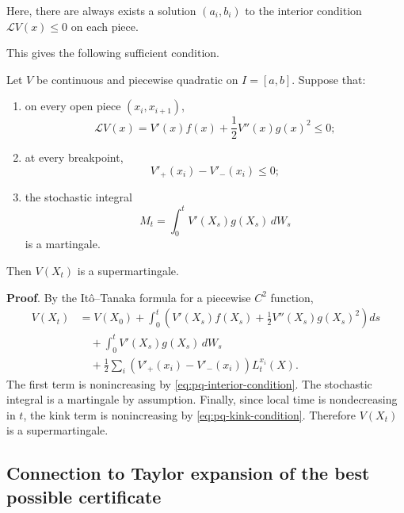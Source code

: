 Here, there are always exists a solution $(a_i,b_i)$ to the interior condition $\mathcal L V(x)\leq 0$ on each piece.

This gives the following sufficient condition.

\begin{fact}
Let $V$ be continuous and piecewise quadratic on $I=[a,b]$. Suppose that:
\begin{enumerate}
    \item on every open piece $(x_i,x_{i+1})$,
    \begin{equation}
        \mathcal L V(x)
        =
        V'(x)f(x)+\frac12 V''(x)g(x)^2
        \leq 0;
        \label{eq:pq-interior-condition}
    \end{equation}
    \item at every breakpoint,
    \begin{equation}
        V'_+(x_i)-V'_-(x_i)\leq 0;
        \label{eq:pq-kink-condition}
    \end{equation}
    \item the stochastic integral
    \begin{equation}
        M_t=\int_0^t V'(X_s)g(X_s)\,dW_s
    \end{equation}
    is a martingale.
\end{enumerate}
Then $V(X_t)$ is a supermartingale.

\textbf{Proof}. By the Itô--Tanaka formula for a piecewise $C^2$ function,
\begin{align}
    V(X_t)
    &=
    V(X_0)
    +
    \int_0^t
    \left(
        V'(X_s)f(X_s)+\frac12 V''(X_s)g(X_s)^2
    \right)ds                                                   \\
    &\quad+
    \int_0^t V'(X_s)g(X_s)\,dW_s                                \\
    &\quad+
    \frac12\sum_i
    \left(V'_+(x_i)-V'_-(x_i)\right)L_t^{x_i}(X).
\end{align}
The first term is nonincreasing by
\eqref{eq:pq-interior-condition}. The stochastic integral is a martingale by
assumption. Finally, since local time is nondecreasing in $t$, the kink term is
nonincreasing by \eqref{eq:pq-kink-condition}. 
Therefore $V(X_t)$ is a supermartingale.
\end{fact}

\subsection{Connection to Taylor expansion of the best possible certificate}

